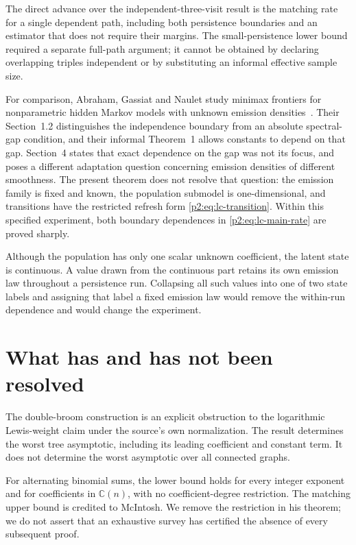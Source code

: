 \documentclass[11pt,a4paper]{article}
\theoremstyle{definition}
\theoremstyle{remark}
\numberwithin{equation}{section}
\begin{document}
The direct advance over the independent-three-visit result is the matching
rate for a single dependent path, including both persistence boundaries and
an estimator that does not require their margins.  The small-persistence
lower bound required a separate full-path argument; it cannot be obtained
by declaring overlapping triples independent or by substituting an informal
effective sample size.

For comparison, Abraham, Gassiat and Naulet study minimax frontiers for
nonparametric hidden Markov models with unknown emission
densities~\cite{p2:abraham2025frontiers}.  Their Section~1.2 distinguishes the
independence boundary from an absolute spectral-gap condition, and their
informal Theorem~1 allows constants to depend on that gap.  Section~4 states
that exact dependence on the gap was not its focus, and poses a different
adaptation question concerning emission densities of different smoothness.
The present theorem does not resolve that question: the emission family is
fixed and known, the population submodel is one-dimensional, and transitions
have the restricted refresh form \eqref{p2:eq:lc-transition}.  Within this
specified experiment, both boundary dependences in
\eqref{p2:eq:lc-main-rate} are proved sharply.

Although the population has only one scalar unknown coefficient, the latent
state is continuous.  A value drawn from the continuous part retains its own
emission law throughout a persistence run.  Collapsing all such values into
one of two state labels and assigning that label a fixed emission law would
remove the within-run dependence and would change the experiment.


\section{What has and has not been resolved}

The double-broom construction is an explicit obstruction to the logarithmic
Lewis-weight claim under the source's own normalization. The result
determines the worst tree asymptotic, including its leading coefficient
and constant term. It does not determine the worst asymptotic over all
connected graphs.

For alternating binomial sums, the lower bound holds for every integer
exponent and for coefficients in $\mathbb C(n)$, with no coefficient-degree
restriction. The matching upper bound is credited to McIntosh. We remove
the restriction in his theorem; we do not assert that an exhaustive survey
has certified the absence of every subsequent proof.
\end{document}
